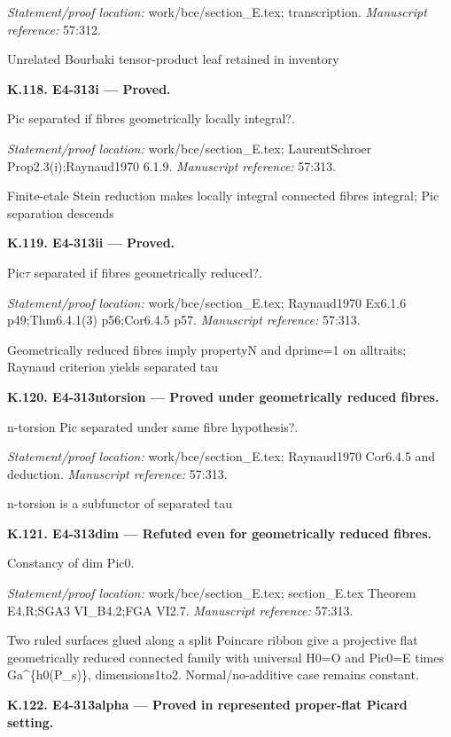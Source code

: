 \par\emph{Statement/proof location:} work/bce/section\_E.tex; transcription.
\emph{Manuscript reference:} 57:312.
\par Unrelated Bourbaki tensor-product leaf retained in inventory
\par\medskip\noindent\textbf{K.118. E4-313i --- Proved.}\par
Pic separated if fibres geometrically locally integral?.
\par\emph{Statement/proof location:} work/bce/section\_E.tex; LaurentSchroer Prop2.3(i);Raynaud1970 6.1.9.
\emph{Manuscript reference:} 57:313.
\par Finite-etale Stein reduction makes locally integral connected fibres integral; Pic separation descends
\par\medskip\noindent\textbf{K.119. E4-313ii --- Proved.}\par
Pic\ensuremath{\tau} separated if fibres geometrically reduced?.
\par\emph{Statement/proof location:} work/bce/section\_E.tex; Raynaud1970 Ex6.1.6 p49;Thm6.4.1(3) p56;Cor6.4.5 p57.
\emph{Manuscript reference:} 57:313.
\par Geometrically reduced fibres imply propertyN and dprime=1 on alltraits; Raynaud criterion yields separated tau
\par\medskip\noindent\textbf{K.120. E4-313ntorsion --- Proved under geometrically reduced fibres.}\par
n-torsion Pic separated under same fibre hypothesis?.
\par\emph{Statement/proof location:} work/bce/section\_E.tex; Raynaud1970 Cor6.4.5 and deduction.
\emph{Manuscript reference:} 57:313.
\par n-torsion is a subfunctor of separated tau
\par\medskip\noindent\textbf{K.121. E4-313dim --- Refuted even for geometrically reduced fibres.}\par
Constancy of dim Pic0.
\par\emph{Statement/proof location:} work/bce/section\_E.tex; section\_E.tex Theorem E4.R;SGA3 VI\_B4.2;FGA VI2.7.
\emph{Manuscript reference:} 57:313.
\par Two ruled surfaces glued along a split Poincare ribbon give a projective flat geometrically reduced connected family with universal H0=O and Pic0=E times Ga\textasciicircum{}\{h0(P\_s)\}, dimensions1to2. Normal/no-additive case remains constant.
\par\medskip\noindent\textbf{K.122. E4-313alpha --- Proved in represented proper-flat Picard setting.}\par
